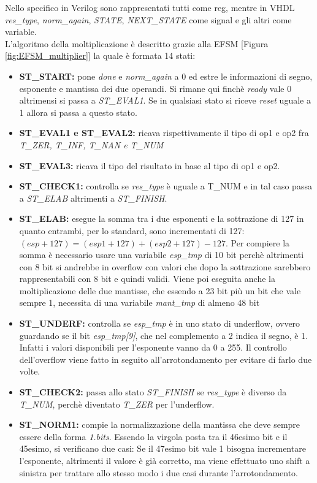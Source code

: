 \documentclass[]{IEEEtran}
\begin{document}
Nello specifico in Verilog sono rappresentati tutti come reg, mentre in VHDL \textit{res\_type}, \textit{norm\_again}, \textit{STATE}, \textit{NEXT\_STATE} come signal e gli altri come variable.
\\L'algoritmo della moltiplicazione è descritto grazie alla EFSM [Figura \ref{fig:EFSM_multiplier}] la quale è formata 14 stati:
\begin{itemize}
    \item \textbf{ST\_START:} pone \textit{done} e \textit{norm\_again} a 0 ed estre le informazioni di segno, esponente e mantissa dei due operandi. Si rimane qui finchè \textit{ready} vale 0 altrimensi si passa a \textit{ST\_EVAL1}. Se in qualsiasi stato si riceve \textit{reset} uguale a 1 allora si passa a questo stato.
    \item \textbf{ST\_EVAL1 e ST\_EVAL2:} ricava rispettivamente il tipo di op1 e op2 fra \textit{T\_ZER, T\_INF, T\_NAN e T\_NUM}
    \item \textbf{ST\_EVAL3:} ricava il tipo del risultato in base al tipo di op1 e op2.
    \item \textbf{ST\_CHECK1:} controlla se \textit{res\_type} è uguale a T\_NUM e in tal caso passa a \textit{ST\_ELAB} altrimenti a \textit{ST\_FINISH}.
    \item \textbf{ST\_ELAB:} esegue la somma tra i due esponenti e la sottrazione di 127 in quanto entrambi, per lo standard, sono incrementati di 127: $(esp+127) = (esp1+127)+(esp2+127)-127$. Per compiere la somma è necessario usare una variabile \textit{esp\_tmp} di 10 bit perchè altrimenti con 8 bit si andrebbe in overflow con valori che dopo la sottrazione sarebbero rappresentabili con 8 bit e quindi validi. Viene poi eseguita anche la moltiplicazione delle due mantisse, che essendo a 23 bit più un bit che vale sempre 1, necessita di una variabile \textit{mant\_tmp} di almeno 48 bit
    \item \textbf{ST\_UNDERF:} controlla se \textit{esp\_tmp} è in uno stato di underflow, ovvero guardando se il bit \textit{esp\_tmp[9]}, che nel complemento a 2 indica il segno, è 1. Infatti i valori disponibili per l'esponente vanno da 0 a 255. Il controllo dell'overflow viene fatto in seguito all'arrotondamento per evitare di farlo due volte.
    \item \textbf{ST\_CHECK2:} passa allo stato \textit{ST\_FINISH} se \textit{res\_type} è diverso da \textit{T\_NUM}, perchè diventato \textit{T\_ZER} per l'underflow.
    \item \textbf{ST\_NORM1:} compie la normalizzazione della mantissa che deve sempre essere della forma \textit{1.bits}. Essendo la virgola posta tra il 46esimo bit e il 45esimo, si verificano due casi: Se il 47esimo bit vale 1 bisogna incrementare l'esponente, altrimenti il valore è già corretto, ma viene effettuato uno shift a sinistra per trattare allo stesso modo i due casi durante l'arrotondamento.

\end{itemize}
\end{document}
